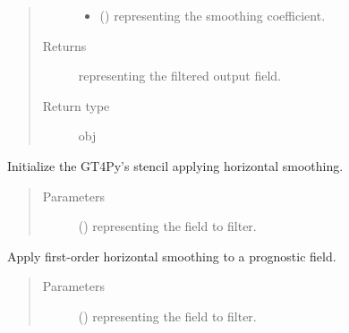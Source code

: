 \documentclass[letterpaper,10pt,english]{sphinxmanual}
\begin{document}
\begin{fulllineitems}
\begin{fulllineitems}
\begin{quote}
\begin{description}
\begin{itemize}
\item {} 
 () \textendash{}  representing the smoothing coefficient.

\end{itemize}

\item[{Returns}] \leavevmode
{} representing the filtered output field.

\item[{Return type}] \leavevmode
obj

\end{description}\end{quote}

\end{fulllineitems}


\begin{fulllineitems}
\label{\detokenize{api:dycore.horizontal_smoothing.HorizontalSmoothingFirstOrderXYZ._stencil_initialize}}
Initialize the GT4Py’s stencil applying horizontal smoothing.
\begin{quote}\begin{description}
\item[{Parameters}] \leavevmode
{} () \textendash{}  representing the field to filter.

\end{description}\end{quote}

\end{fulllineitems}


\begin{fulllineitems}
\label{\detokenize{api:dycore.horizontal_smoothing.HorizontalSmoothingFirstOrderXYZ.apply}}
Apply first-order horizontal smoothing to a prognostic field.
\begin{quote}\begin{description}
\item[{Parameters}] \leavevmode
{} () \textendash{}  representing the field to filter.


\end{description}
\end{quote}
\end{fulllineitems}
\end{fulllineitems}
\end{document}
